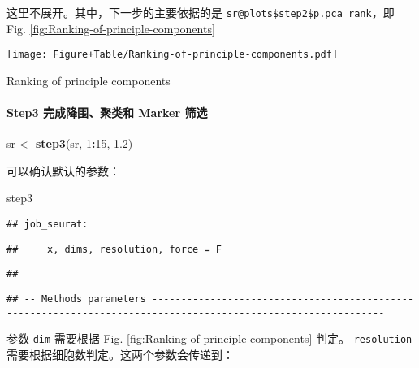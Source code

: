 \documentclass[
]{article}
\newenvironment{Shaded}{\begin{snugshade}}{\end{snugshade}}
\newcommand{\DecValTok}[1]{\textcolor[rgb]{0.00,0.00,0.81}{#1}}
\newcommand{\FloatTok}[1]{\textcolor[rgb]{0.00,0.00,0.81}{#1}}
\newcommand{\KeywordTok}[1]{\textcolor[rgb]{0.13,0.29,0.53}{\textbf{#1}}}
\newcommand{\NormalTok}[1]{#1}
\newcommand{\OperatorTok}[1]{\textcolor[rgb]{0.81,0.36,0.00}{\textbf{#1}}}
\newcommand{\StringTok}[1]{\textcolor[rgb]{0.31,0.60,0.02}{#1}}
\begin{document}
这里不展开。其中，下一步的主要依据的是 \texttt{sr@plots\$step2\$p.pca\_rank}，即 Fig. \ref{fig:Ranking-of-principle-components}

\def\@captype{figure}
\begin{center}
\texttt{[image: Figure+Table/Ranking-of-principle-components.pdf]}
\caption{Ranking of principle components}\label{fig:Ranking-of-principle-components}
\end{center}

\hypertarget{step3-ux5b8cux6210ux964dux56f4ux805aux7c7bux548c-marker-ux7b5bux9009}{%
\paragraph{Step3 完成降围、聚类和 Marker 筛选}\label{step3-ux5b8cux6210ux964dux56f4ux805aux7c7bux548c-marker-ux7b5bux9009}}

\begin{Shaded}
\begin{Highlighting}[]
\NormalTok{sr \textless{}{-}}\StringTok{ }\KeywordTok{step3}\NormalTok{(sr, }\DecValTok{1}\OperatorTok{:}\DecValTok{15}\NormalTok{, }\FloatTok{1.2}\NormalTok{)}
\end{Highlighting}
\end{Shaded}

可以确认默认的参数：

\begin{Shaded}
\begin{Highlighting}[]
\NormalTok{step3}
\end{Highlighting}
\end{Shaded}

\begin{verbatim}
## job_seurat:
\end{verbatim}

\begin{verbatim}
##     x, dims, resolution, force = F
\end{verbatim}

\begin{verbatim}
## 
\end{verbatim}

\begin{verbatim}
## -- Methods parameters --------------------------------------------------------------------------------------------------------------
\end{verbatim}

参数 \texttt{dim} 需要根据 Fig. \ref{fig:Ranking-of-principle-components} 判定。
\texttt{resolution} 需要根据细胞数判定。这两个参数会传递到：
\end{document}
